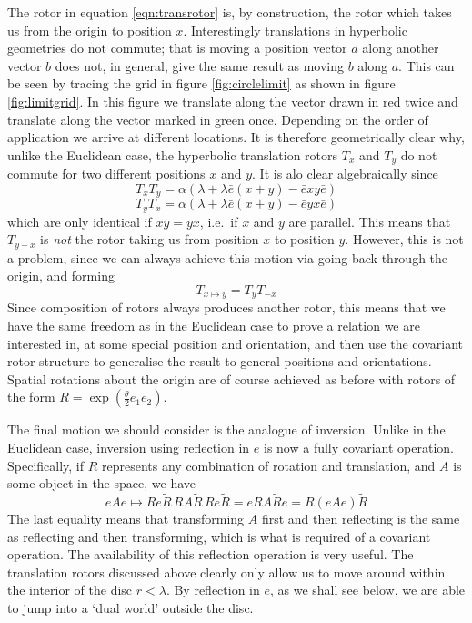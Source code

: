 The rotor in equation \ref{eqn:transrotor} is, by construction, the rotor 
which takes us from the origin to position $x$. Interestingly translations in
hyperbolic geometries do not commute; that is moving a position
vector $a$ along another vector $b$ does not, in general, give the same result
as moving $b$ along $a$. This can be seen by tracing the grid
in figure \ref{fig:circlelimit} as shown in figure \ref{fig:limitgrid}.
In this figure we translate along the vector drawn in red twice and translate
along the vector marked in green once. Depending on the order of application
we arrive at different locations.
It is therefore geometrically clear why,
unlike the Euclidean case, the hyperbolic translation rotors
$T_x$ and $T_y$ do not commute
for two different positions $x$ and $y$. 
It is alo clear algebraically since
\[
T_xT_y = \alpha(\lambda + \lambda\bar{e}(x+y) - \bar{e}xy\bar{e})
\]
\[
T_yT_x = \alpha(\lambda + \lambda\bar{e}(x+y) - \bar{e}yx\bar{e})
\]
which are only identical if $xy = yx$, i.e.\ if $x$ and $y$ are parallel.
This means that
$T_{y-x}$ is {\em not} the rotor taking us from
position $x$ to position $y$. However, this is not a
problem, since we can always achieve this motion via
going back through the origin, and forming
%
\begin{equation}
T_{x \mapsto y} = T_y T_{-x}
\end{equation}
%
Since composition of rotors always produces another
rotor, this means that we have the same freedom as in the
Euclidean case to prove a relation we are interested in,
at some special position and orientation, and then use
the covariant rotor structure to generalise the result to
general positions and orientations. Spatial rotations about the origin are
of course achieved as before with rotors of the form
$R=\exp\left(\frac{\theta}{2}e_1 e_2\right)$.

The final motion we should consider is the analogue of
inversion. Unlike in the Euclidean case, inversion using
reflection in $e$ is now a fully covariant operation.
Specifically, if $R$ represents any combination of
rotation and translation, and $A$ is some object in the
space, we have
%
\begin{equation}
eAe \mapsto Re\tilde{R}\, RA\tilde{R}\, Re\tilde{R} = e
RA\tilde{R} e = R(eAe) \tilde{R}
\end{equation}
%
The last equality means that transforming $A$ first and
then reflecting is the same as reflecting and then
transforming, which is what is required of a covariant
operation. The availability of this reflection operation
is very useful. The translation rotors discussed above
clearly only allow us to move around within the interior
of the disc $r<\lambda$. By reflection in $e$, as we
shall see below, we are able to jump into a `dual world'
outside the disc.

